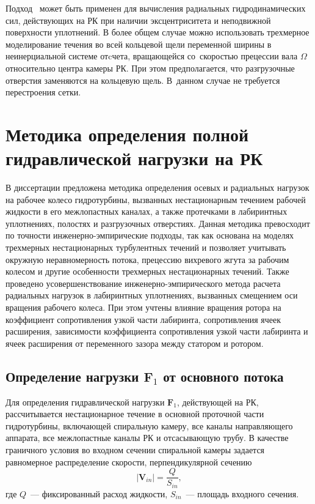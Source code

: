 Подход~\cite{xi_rhode} может быть применен для вычисления радиальных гидродинамических сил, действующих 
на РК при наличии эксцентриситета и неподвижной поверхности уплотнений.
В более общем случае можно использовать трехмерное моделирование течения во всей кольцевой щели 
переменной ширины в неинерциальной системе отcчета, вращающейся со~скоростью прецессии 
вала $\Omega$ относительно центра камеры РК. При этом предполагается, что разгрузочные отверстия 
заменяются на кольцевую щель. В~данном случае не требуется перестроения сетки.

\section{Методика определения полной гидравлической нагрузки на РК}
\label{s:34}
В диссертации предложена методика определения осевых и радиальных нагрузок на
рабочее колесо гидротурбины, вызванных нестационарным течением рабочей жидкости в его межлопастных каналах, 
а также протечками в лабиринтных уплотнениях, полостях и разгрузочных отверстиях. Данная методика превосходит 
по точности инженерно-эмпирические подходы, так как основана на моделях трехмерных нестационарных
турбулентных течений и позволяет учитывать окружную неравномерность потока, прецессию вихревого жгута за 
рабочим колесом и другие особенности трехмерных нестационарных течений. Также проведено усовершенствование 
инженерно-эмпирического метода расчета радиальных нагрузок в лабиринтных уплотнениях, вызванных смещением
оси вращения рабочего колеса. При этом учтены влияние вращения ротора на коэффициент сопротивления узкой 
части лабиринта, сопротивления ячеек расширения, зависимости коэффициента сопротивления узкой части лабиринта 
и ячеек расширения от переменного зазора между статором и ротором.

\subsection{Определение нагрузки $\textbf{F}_1$ от основного потока}
\label{s:341}
Для определения гидравлической нагрузки $\textbf{F}_1$, действующей на РК, рассчитывается нестационарное 
течение в основной проточной части гидротурбины, включающей спиральную камеру, все каналы направляющего 
аппарата, все межлопастные каналы РК и отсасывающую трубу. В качестве граничного условия во входном сечении 
спиральной камеры задается равномерное распределение скорости, перпендикулярной сечению
\begin{equation*}
  \left| {\textbf{V}_{in}} \right| = \frac{Q}{{S_{in} }},
\end{equation*}
где $Q$~--- фиксированный расход жидкости, $S_{in}$~--- площадь входного сечения.

